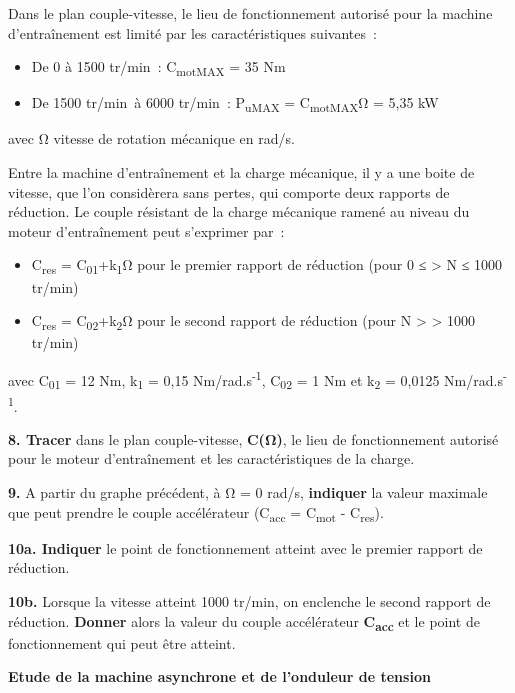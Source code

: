 Dans le plan couple-vitesse, le lieu de fonctionnement autorisé pour la machine d'entraînement est limité par les caractéristiques suivantes~:

\begin{itemize}
\item
  De 0 à 1500 tr/min~: C\textsubscript{motMAX} = 35 Nm
\item
  De 1500 tr/min~à 6000 tr/min~: P\textsubscript{uMAX} = C\textsubscript{motMAX}Ω = 5,35 kW
\end{itemize}

avec Ω vitesse de rotation mécanique en rad/s.

Entre la machine d'entraînement et la charge mécanique, il y a une boite de vitesse, que l'on considèrera sans pertes, qui comporte deux rapports de réduction. Le couple résistant de la charge mécanique ramené au niveau du moteur d'entraînement peut s'exprimer par~:

\begin{itemize}
\item
  C\textsubscript{res} = C\textsubscript{01}+k\textsubscript{1}Ω pour le premier rapport de réduction (pour 0 ≤ \textgreater{} N ≤ 1000 tr/min)
\item
  C\textsubscript{res} = C\textsubscript{02}+k\textsubscript{2}Ω pour le second rapport de réduction (pour N \textgreater{} \textgreater{} 1000 tr/min)
\end{itemize}

avec C\textsubscript{01} = 12 Nm, k\textsubscript{1} = 0,15 Nm/rad.s\textsuperscript{-1}, C\textsubscript{02} = 1 Nm et k\textsubscript{2} = 0,0125 Nm/rad.s\textsuperscript{-1}.

\textbf{8. Tracer} dans le plan couple-vitesse, \textbf{C(Ω)}, le lieu de fonctionnement autorisé pour le moteur d'entraînement et les caractéristiques de la charge.

\textbf{9.} A partir du graphe précédent, à Ω = 0 rad/s, \textbf{indiquer} la valeur maximale que peut prendre le couple accélérateur (C\textsubscript{acc} = C\textsubscript{mot} - C\textsubscript{res}).

\textbf{10a. Indiquer} le point de fonctionnement atteint avec le premier rapport de réduction.

\textbf{10b.} Lorsque la vitesse atteint 1000 tr/min, on enclenche le second rapport de réduction. \textbf{Donner} alors la valeur du couple accélérateur \textbf{C\textsubscript{acc}} et le point de fonctionnement qui peut être atteint.

\textbf{Etude de la machine asynchrone et de l'onduleur de tension}

